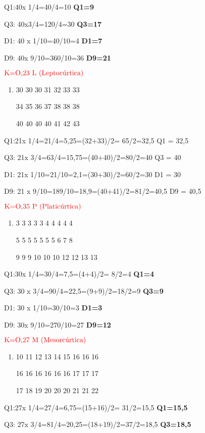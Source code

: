 \documentclass[]{book}
\begin{document}
Q1:40x 1/4=40/4=10 \textbf{Q1=9}

Q3: 40x3/4=120/4=30 \textbf{Q3=17}

D1: 40 x 1/10=40/10=4 \textbf{D1=7}

D9: 40x 9/10=360/10=36 \textbf{D9=21}

\(\color{red}{\text{K=O,23 L (Leptocúrtica)}}\)

\begin{enumerate}
\def\labelenumi{\alph{enumi})}
\setcounter{enumi}{7}
\item
  30 30 30 31 32 33 33

  34 35 36 37 38 38 38

  40 40 40 40 41 42 43
\end{enumerate}

Q1:21x 1/4=21/4=5,25=(32+33)/2= 65/2=32,5 Q1 = 32,5

Q3: 21x 3/4=63/4=15,75=(40+40)/2=80/2=40 Q3 = 40

D1: 21x 1/10=21/10=2,1=(30+30)/2=60/2=30 D1 = 30

D9: 21 x 9/10=189/10=18,9=(40+41)/2=81/2=40,5 D9 = 40,5

\(\color{red}{\text{K=O,35  P (Platicúrtica)}}\)

\begin{enumerate}
\def\labelenumi{\roman{enumi})}
\item
  3 3 3 3 3 4 4 4 4 4

  5 5 5 5 5 5 5 6 7 8

  9 9 9 10 10 10 12 12 13 13
\end{enumerate}

Q1:30x 1/4=30/4=7,5=(4+4)/2= 8/2=4 \textbf{Q1=4}

Q3: 30 x 3/4=90/4=22,5=(9+9)/2=18/2=9 \textbf{Q3=9}

D1: 30 x 1/10=30/10=3 \textbf{D1=3}

D9: 30x 9/10=270/10=27 \textbf{D9=12}

\(\color{red}{\text{K=O,27 M (Mesorcúrtica)}}\)

\begin{enumerate}
\def\labelenumi{\alph{enumi})}
\setcounter{enumi}{9}
\item
  10 11 12 13 14 15 16 16 16

  16 16 16 16 16 16 17 17 17

  17 18 19 20 20 20 21 21 22
\end{enumerate}

Q1:27x 1/4=27/4=6,75=(15+16)/2= 31/2=15,5 \textbf{Q1=15,5}

Q3: 27x 3/4=81/4=20,25=(18+19)/2=37/2=18,5 \textbf{Q3=18,5}
\end{document}
